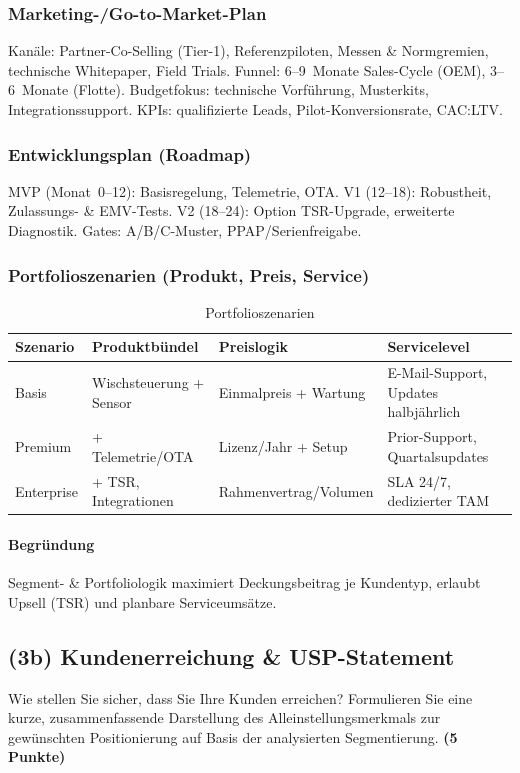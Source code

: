 \documentclass[
%
ngerman %
%
numeric %
]{wbh-assignment}
\begin{document}
\subsubsection{Marketing-/Go-to-Market-Plan}
Kanäle: Partner-Co-Selling (Tier-1), Referenzpiloten, Messen \& Normgremien, technische Whitepaper, Field Trials. Funnel: 6–9~Monate Sales-Cycle (OEM), 3–6~Monate (Flotte). Budgetfokus: technische Vorführung, Musterkits, Integrationssupport. KPIs: qualifizierte Leads, Pilot-Konversionsrate, CAC:LTV.

\subsubsection{Entwicklungsplan (Roadmap)}
MVP (Monat~0–12): Basisregelung, Telemetrie, OTA. V1 (12–18): Robustheit, Zulassungs- \& EMV-Tests. V2 (18–24): Option TSR-Upgrade, erweiterte Diagnostik. Gates: A/B/C-Muster, PPAP/Serienfreigabe.

\subsubsection{Portfolioszenarien (Produkt, Preis, Service)}
\begin{table}[htb!]
\centering
\caption{Portfolioszenarien}
\begin{tabular}{l l l l}
\textbf{Szenario} & \textbf{Produktbündel} & \textbf{Preislogik} & \textbf{Servicelevel} \\
\hline
Basis & Wischsteuerung + Sensor & Einmalpreis + Wartung & E-Mail-Support, Updates halbjährlich \\
Premium & + Telemetrie/OTA & Lizenz/Jahr + Setup & Prior-Support, Quartalsupdates \\
Enterprise & + TSR, Integrationen & Rahmenvertrag/Volumen & SLA 24/7, dedizierter TAM \\
\end{tabular}
\end{table}

\paragraph{Begründung}
Segment- \& Portfoliologik maximiert Deckungsbeitrag je Kundentyp, erlaubt Upsell (TSR) und planbare Serviceumsätze.

\subsection{(3b) Kundenerreichung \& USP-Statement}
\begin{aufgabenstellung}
Wie stellen Sie sicher, dass Sie Ihre Kunden erreichen? Formulieren Sie eine kurze, zusammenfassende Darstellung des Alleinstellungsmerkmals zur gewünschten Positionierung auf Basis der analysierten Segmentierung. \textbf{(5 Punkte)}
\end{aufgabenstellung}
\end{document}
